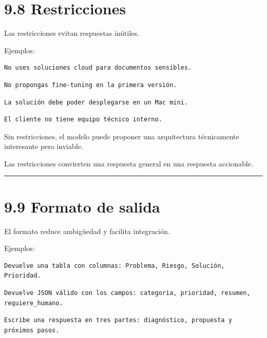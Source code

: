 \section{9.8 Restricciones}\label{restricciones-1}

Las restricciones evitan respuestas inútiles.

Ejemplos:

\begin{lstlisting}
No uses soluciones cloud para documentos sensibles.
\end{lstlisting}

\begin{lstlisting}
No propongas fine-tuning en la primera versión.
\end{lstlisting}

\begin{lstlisting}
La solución debe poder desplegarse en un Mac mini.
\end{lstlisting}

\begin{lstlisting}
El cliente no tiene equipo técnico interno.
\end{lstlisting}

Sin restricciones, el modelo puede proponer una arquitectura
técnicamente interesante pero inviable.

Las restricciones convierten una respuesta general en una respuesta
accionable.

\begin{center}\rule{0.5\linewidth}{0.5pt}\end{center}

\section{9.9 Formato de salida}\label{formato-de-salida}

El formato reduce ambigüedad y facilita integración.

Ejemplos:

\begin{lstlisting}
Devuelve una tabla con columnas: Problema, Riesgo, Solución, Prioridad.
\end{lstlisting}

\begin{lstlisting}
Devuelve JSON válido con los campos: categoria, prioridad, resumen, requiere_humano.
\end{lstlisting}

\begin{lstlisting}
Escribe una respuesta en tres partes: diagnóstico, propuesta y próximos pasos.
\end{lstlisting}

